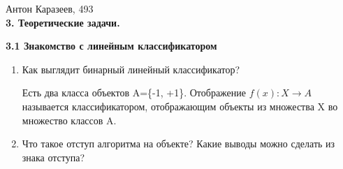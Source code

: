 \documentclass[12pt]{article}
\begin{document}
	Антон Каразеев, 493\\
	
	\textbf{3. Теоретические задачи.}
	
	\textbf{3.1 Знакомство с линейным классификатором}
	
	\begin{enumerate}
		\item Как выглядит бинарный линейный классификатор?
			
			Есть два класса объектов A=\{-1, +1\}. Отображение $f(x): X \rightarrow A$ называется классификатором, отображающим объекты из множества X во множество классов A.
		
		\item Что такое отступ алгоритма на объекте? Какие выводы можно сделать из знака отступа?
	\end{enumerate}
\end{document}
